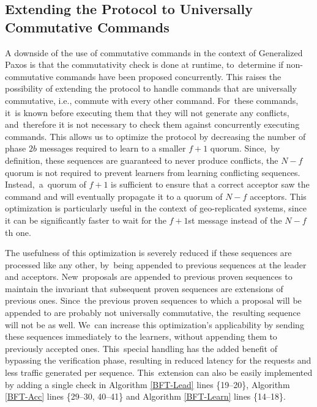 \documentclass[algorithms,article,accept,moreauthors,pdftex,10pt,a4paper]{Definitions/mdpi}
\begin{document}
\subsection{Extending the Protocol to Universally Commutative Commands}
A downside of the use of commutative commands in the
context of Generalized Paxos is that the commutativity check is done
at runtime, to~determine if non-commutative commands have
been proposed concurrently.
This raises the possibility of extending the protocol to handle
commands that are universally commutative, i.e., commute with every
other command. For~these commands, it~is known before executing them
that they will not generate any conflicts, and~therefore it is not
necessary to check them against concurrently executing commands. This
allows us to optimize the protocol by decreasing the number of phase
$2b$ messages required to learn to a smaller $f+1$ quorum. Since,~by
definition, these sequences are guaranteed to never produce conflicts,
the $N-f$ quorum is not required to prevent learners from learning
conflicting sequences. Instead,~a~quorum of $f+1$ is sufficient to
ensure that a correct acceptor saw the command and will eventually
propagate it to a quorum of $N-f$ acceptors. 
This optimization is particularly useful in the context of 
geo-replicated systems, since it can be significantly faster
to wait for the $f+1$st message instead of the $N-f$th one.\par
The usefulness of this optimization is severely reduced if these sequences are processed like any other, by~being appended to previous sequences at the leader and acceptors. New~proposals are appended to previous proven sequences to maintain the invariant that subsequent proven sequences are extensions of previous ones. Since~the previous proven sequences to which a proposal will be appended to are probably not universally commutative, the~resulting sequence will not be as well. We~can increase this optimization's applicability by sending these sequences immediately to the learners, without appending them to previously accepted ones. This~special handling has the added benefit of bypassing the verification phase, resulting in reduced latency for the requests and less traffic generated per sequence. This~extension can also be easily implemented by adding a single check in Algorithm \ref{BFT-Lead} lines \{19--20\}, Algorithm \ref{BFT-Acc} lines \{29--30, 40--41\} and Algorithm \ref{BFT-Learn} lines \{14--18\}.
\end{document}
